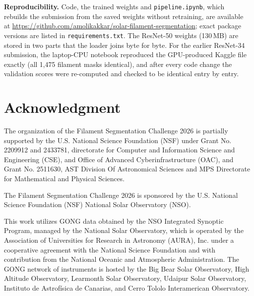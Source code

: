 \documentclass[sigconf]{acmart}
\begin{document}
\textbf{Reproducibility.} Code, the trained weights and \texttt{pipeline.ipynb}, which rebuilds the submission from the saved weights without retraining, are available at \url{https://github.com/amolikakkar/solar-filament-segmentation}; exact package versions are listed in \texttt{requirements.txt}. The ResNet-50 weights (130\,MB) are stored in two parts that the loader joins byte for byte. For the earlier ResNet-34 submission, the laptop-CPU notebook reproduced the GPU-produced Kaggle file exactly (all 1,475 filament masks identical), and after every code change the validation scores were re-computed and checked to be identical entry by entry.


\section{Acknowledgment}\label{sec:acknowledgment}
    The organization of the Filament Segmentation Challenge 2026 is partially supported by the U.S. National Science Foundation (NSF) under Grant No. 2209912 and 2433781, directorate for Computer and Information Science and Engineering (CSE), and Office of Advanced Cyberinfrastructure (OAC), and Grant No. 2511630, AST Division Of Astronomical Sciences and MPS Directorate for Mathematical and Physical Sciences.

    The Filament Segmentation Challenge 2026 is sponsored by the U.S. National Science Foundation (NSF) National Solar Observatory (NSO).

    This work utilizes GONG data obtained by the NSO Integrated Synoptic Program, managed by the National Solar Observatory, which is operated by the Association of Universities for Research in Astronomy (AURA), Inc. under a cooperative agreement with the National Science Foundation and with contribution from the National Oceanic and Atmospheric Administration. The GONG network of instruments is hosted by the Big Bear Solar Observatory, High Altitude Observatory, Learmonth Solar Observatory, Udaipur Solar Observatory, Instituto de Astrofísica de Canarias, and Cerro Tololo Interamerican Observatory.



\end{document}
